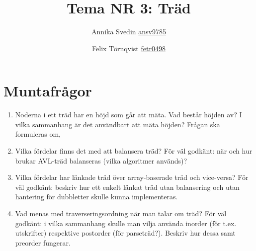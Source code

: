 \documentclass[a5paper,10pt,oneside]{article}
\title{Tema NR 3: Träd}
\author{Annika Svedin \url{ansv9785} \and Felix Törnqvist \url{fetr0498}}
\begin{document}
\maketitle

\section*{Muntafrågor}

\begin{enumerate}

\item

Noderna i ett träd har en höjd som går att mäta. Vad består höjden av? I vilka sammanhang är det användbart att mäta höjden?
Frågan ska formuleras om,


\item
Vilka fördelar finns det med att balansera träd? För väl godkänt: när och hur brukar AVL-träd balanseras (vilka algoritmer används)?

\item
Vilka fördelar har länkade träd över array-baserade träd och vice-versa? För väl godkänt: beskriv hur ett enkelt länkat träd utan balansering och utan hantering för dubbletter skulle kunna implementeras.

\item
Vad menas med traverseringsordning när man talar om träd? För väl godkänt: i vilka sammanhang skulle man vilja använda inorder (för t.ex. utskrifter) respektive postorder (för parseträd?). Beskriv hur dessa samt preorder fungerar.

\end{enumerate}
\end{document}
